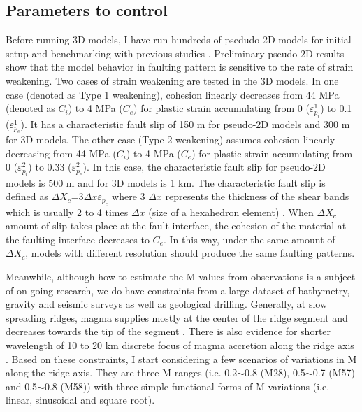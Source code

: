 \subsection{Parameters to control}
Before running 3D models, I have run hundreds of psedudo-2D models for initial setup and benchmarking with previous studies \citep[e.g.,][]{Buck2005, Tucholke2008}. Preliminary pseudo-2D results show that the model behavior in faulting pattern is sensitive to the rate of strain weakening. Two cases of strain weakening are tested in the 3D models. In one case (denoted as Type 1 weakening), cohesion linearly decreases from 44 MPa (denoted as $C_{i}$) to 4 MPa ($C_{e}$) for plastic strain accumulating from 0 ($\varepsilon_{p_{i}}^{1}$) to 0.1 ($\varepsilon_{p_{e}}^{1}$). It has a characteristic fault slip of 150 m for pseudo-2D models and 300 m for 3D models. The other case (Type 2 weakening) assumes cohesion linearly decreasing from 44 MPa ($C_{i}$) to 4 MPa ($C_{e}$) for plastic strain accumulating from 0 ($\varepsilon_{p_{i}}^{2}$) to 0.33 ($\varepsilon_{p_{e}}^{2}$). In this case, the characteristic fault slip for pseudo-2D models is 500 m and for 3D models is 1 km. The characteristic fault slip is defined as $\Delta X_{c}$=3$\Delta x \varepsilon_{p_{e}}$ where 3 $\Delta x$ represents the thickness of the shear bands which is usually 2 to 4 times $\Delta x$ (size of a hexahedron element) \citep{Lavier2000}. When $\Delta X_{c}$ amount of slip takes place at the fault interface, the cohesion of the material at the faulting interface decreases to $C_{e}$. In this way, under the same amount of $\Delta X_{c}$, models with different resolution should produce the same faulting patterns. 

Meanwhile, although how to estimate the M values from observations is a subject of on-going research, we do have constraints from a large dataset of bathymetry, gravity and seismic surveys as well as geological drilling. Generally, at slow spreading ridges, magma supplies mostly at the center of the ridge segment and decreases towards the tip of the segment \citep{Tolstoy1993,Chen1999,Carbotte2015}. There is also evidence for shorter wavelength of 10 to 20 km discrete focus of magma accretion along the ridge axis \citep{Lin1990}. Based on these constraints, I start considering a few scenarios of variations in M along the ridge axis. They are three M ranges (i.e. 0.2$\sim$0.8 (M28), 0.5$\sim$0.7 (M57) and 0.5$\sim$0.8 (M58)) with three simple functional forms of M variations (i.e. linear, sinusoidal and square root).

